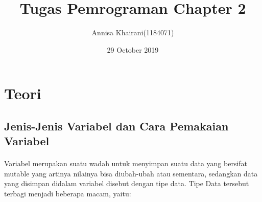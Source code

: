 \documentclass{article}
\title{Tugas Pemrograman Chapter 2}
\author{Annisa Khairani(1184071) }
\date{29 October 2019}
\begin{document}
\maketitle

\section{Teori}
\subsection{Jenis-Jenis Variabel dan Cara Pemakaian Variabel }
\paragraph{}
    Variabel merupakan suatu wadah untuk menyimpan suatu data yang bersifat mutable yang artinya nilainya bisa diubah-ubah atau sementara, sedangkan data yang disimpan didalam variabel disebut dengan tipe data. Tipe Data tersebut terbagi menjadi beberapa macam, yaitu:
\end{document}
